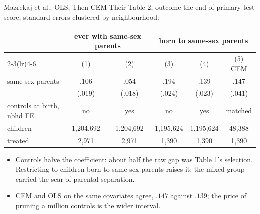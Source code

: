 \documentclass[aspectratio=169,11pt,xcolor=dvipsnames]{beamer}
\begin{document}
\begin{frame}{Mazrekaj et al.: OLS, Then CEM}
Their Table 2, outcome the end-of-primary test score, standard errors
clustered by neighbourhood:
\begin{center}\footnotesize
\renewcommand{\arraystretch}{1.05}
\begin{tabular}{lccccc}
\toprule
 & \multicolumn{2}{c}{ever with same-sex parents} & \multicolumn{3}{c}{born to same-sex parents} \\
\cmidrule(lr){2-3}\cmidrule(lr){4-6}
 & (1) & (2) & (3) & (4) & (5) CEM \\
\midrule
same-sex parents & .106 & .054 & .194 & .139 & .147 \\
                 & (.019) & (.018) & (.024) & (.023) & (.041) \\
controls at birth, nbhd FE & no & yes & no & yes & matched \\
children & 1,204,692 & 1,204,692 & 1,195,624 & 1,195,624 & 48,388 \\
treated & 2,971 & 2,971 & 1,390 & 1,390 & 1,390 \\
\bottomrule
\end{tabular}
\end{center}
\begin{itemize}\itemsep2pt
  \item Controls halve the coefficient: about half the raw gap was Table 1's
        selection. Restricting to children born to same-sex parents raises it:
        the mixed group carried the scar of parental separation.
  \item CEM and OLS on the same covariates agree, $.147$ against $.139$; the
        price of pruning a million controls is the wider interval.
\end{itemize}
\end{frame}
\end{document}
